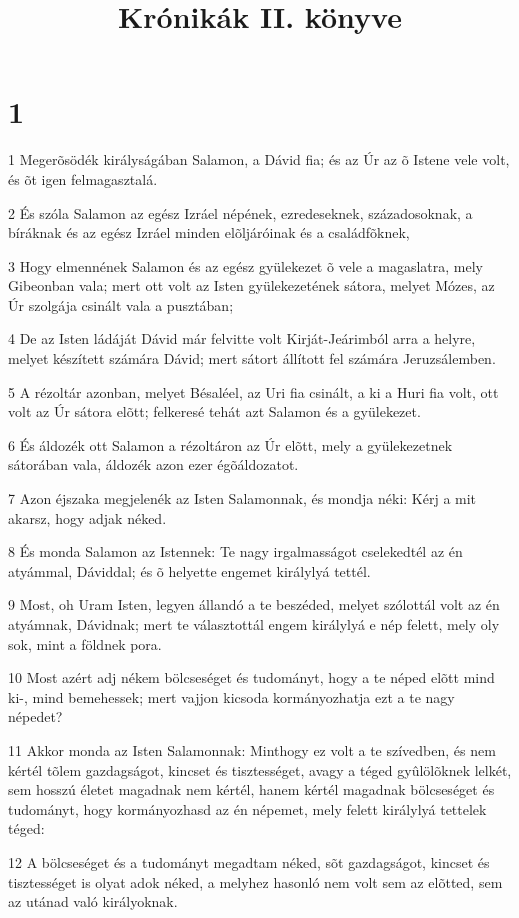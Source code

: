 

\title{Krónikák II. könyve}


\chapter{1}

\par 1 Megerõsödék királyságában Salamon, a Dávid fia; és az Úr az õ Istene vele volt, és õt igen felmagasztalá.
\par 2 És szóla Salamon az egész Izráel népének, ezredeseknek, századosoknak, a bíráknak és az egész Izráel minden elõljáróinak és a családfõknek,
\par 3 Hogy elmennének Salamon és az egész gyülekezet õ vele a magaslatra, mely Gibeonban vala; mert ott volt az Isten gyülekezetének sátora, melyet Mózes, az Úr szolgája csinált vala a pusztában;
\par 4 De az Isten ládáját Dávid már felvitte volt Kirját-Jeárimból arra a helyre, melyet készített számára Dávid; mert sátort állított fel számára Jeruzsálemben.
\par 5 A rézoltár azonban, melyet Bésaléel, az Uri fia csinált, a ki a Huri fia volt, ott volt az Úr sátora elõtt; felkeresé tehát azt Salamon és a gyülekezet.
\par 6 És áldozék ott Salamon a rézoltáron az Úr elõtt, mely a gyülekezetnek sátorában vala, áldozék azon ezer égõáldozatot.
\par 7 Azon éjszaka megjelenék az Isten Salamonnak, és mondja néki: Kérj a mit akarsz, hogy adjak néked.
\par 8 És monda Salamon az Istennek: Te nagy irgalmasságot cselekedtél az én atyámmal, Dáviddal; és õ helyette engemet királylyá tettél.
\par 9 Most, oh Uram Isten, legyen állandó a te beszéded, melyet szólottál volt az én atyámnak, Dávidnak; mert te választottál engem királylyá e nép felett, mely oly sok, mint a földnek pora.
\par 10 Most azért adj nékem bölcseséget és tudományt, hogy a te néped elõtt mind ki-, mind bemehessek; mert vajjon kicsoda  kormányozhatja ezt a te nagy népedet?
\par 11 Akkor monda az Isten Salamonnak: Minthogy ez volt a te szívedben, és nem kértél tõlem gazdagságot, kincset és tisztességet, avagy a téged gyûlölõknek lelkét, sem hosszú életet magadnak nem kértél, hanem kértél magadnak bölcseséget és tudományt, hogy kormányozhasd az én népemet, mely felett királylyá tettelek téged:
\par 12 A bölcseséget és a tudományt megadtam néked, sõt gazdagságot, kincset és tisztességet is olyat adok néked, a melyhez hasonló nem volt sem az elõtted, sem az utánad való királyoknak.

